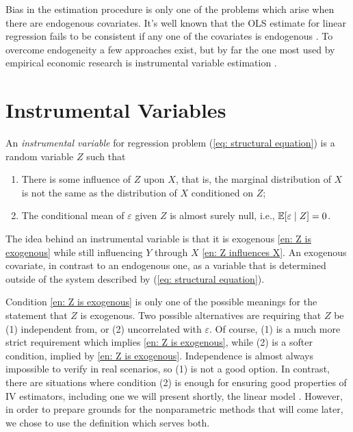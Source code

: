Bias in the estimation procedure is only one of the problems which arise when there are endogenous covariates.
It's well known that the OLS estimate for linear regression fails to be consistent if any one of the covariates is endogenous \cite{wooldridge2001}.
To overcome endogeneity a few approaches exist, but by far the one most used by empirical economic research is instrumental variable estimation \cite{wooldridge2001}.

\section{Instrumental Variables}

\begin{deff}
    \label{def: iv}
    An \emph{instrumental variable} for regression problem (\ref{eq: structural equation}) is a random variable $ Z $ such that
    \begin{enumerate}
        \item There is some influence of $ Z $ upon $ X $, that is, the marginal distribution of $ X $ is not the same as the distribution of $ X $ conditioned on $ Z $; \label{en: Z influences X}
        \item The conditional mean of $ \varepsilon $ given $ Z $ is almost surely null, i.e., $ \mathbb{E} [ \varepsilon \mid Z ] = 0 $. \label{en: Z is exogenous}
    \end{enumerate}
\end{deff}


The idea behind an instrumental variable is that it is exogenous \ref{en: Z is exogenous} while still influencing $ Y $ through $ X $ \ref{en: Z influences X}.
An exogenous covariate, in contrast to an endogenous one, as a variable that is determined outside of the system described by (\ref{eq: structural equation}).

Condition \ref{en: Z is exogenous} is only one of the possible meanings for the statement that $ Z $ is exogenous.
Two possible alternatives are requiring that $ Z $ be (1) independent from, or (2) uncorrelated with $ \varepsilon $.
Of course, (1) is a much more strict requirement which implies \ref{en: Z is exogenous}, while (2) is a softer condition, implied by \ref{en: Z is exogenous}.
Independence is almost always impossible to verify in real scenarios, so (1) is not a good option.
In contrast, there are situations where condition (2) is enough for ensuring good properties of IV estimators, including one we will present shortly, the linear model \cite{wooldridge2001}.
However, in order to prepare grounds for the nonparametric methods that will come later, we chose to use the definition which serves both.

